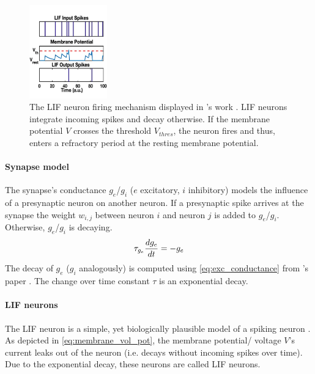 \begin{figure}[htbp]
    \center
    \includegraphics[width=0.3\textwidth]{pictures/input_pot_thres_output_altered.jpg}
    \caption{The \ac{LIF} neuron firing mechanism displayed in \authorsinputThresOutput{}'s work \cite{input_thres_output}.
    \ac{LIF} neurons integrate incoming spikes and decay otherwise.
    If the membrane potential $V$ crosses the threshold $V_{thres}$, the neuron fires and thus, 
    enters a refractory period at the resting membrane potential.}
    \label{fig:input_thres_output}
\end{figure}

\vspace{-3mm}
\paragraph{\textbf{Synapse model}}
The synapse's conductance $g_e$/$g_i$ ($e$ excitatory, $i$ inhibitory) models the influence of a presynaptic neuron on another neuron.
If a presynaptic spike arrives at the synapse the weight $w_{i,j}$ between neuron $i$ and neuron $j$ is added to $g_e$/$g_i$.
Otherwise, $g_e$/$g_i$ is decaying.
%
\begin{equation}
    \centering
    \label{eq:exc_conductance}
    \tau_{g_e} \frac{dg_e}{dt} = - g_e
\end{equation}
%
The decay of $g_e$ ($g_i$ analogously) is computed using \autoref{eq:exc_conductance} from \authorsSNN{}'s paper \cite{SNN}.
The change over time constant $\tau$ is an exponential decay.

\vspace{-3mm}
\paragraph{\textbf{\ac{LIF} neurons}}
The \ac{LIF} neuron is a simple, yet biologically plausible model of a spiking neuron \cite{RBM_SNN}.
As depicted in \autoref{eq:membrane_vol_pot}, the membrane potential/ voltage $V$'s current leaks out of the neuron 
(i.e. decays without incoming spikes over time).
Due to the exponential decay, these neurons are called \ac{LIF} neurons.

